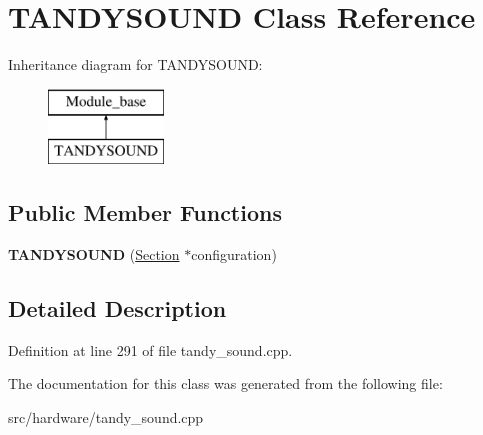 \hypertarget{classTANDYSOUND}{\section{T\-A\-N\-D\-Y\-S\-O\-U\-N\-D Class Reference}
\label{classTANDYSOUND}
}
Inheritance diagram for T\-A\-N\-D\-Y\-S\-O\-U\-N\-D\-:\begin{figure}[H]
\begin{center}
\leavevmode
\includegraphics[height=2.000000cm]{classTANDYSOUND}
\end{center}
\end{figure}
\subsection*{Public Member Functions}
\begin{DoxyCompactItemize}
\item 
\hypertarget{classTANDYSOUND_a3595cf4fd040eb563c9ffb1dc69944b8}{{\bfseries T\-A\-N\-D\-Y\-S\-O\-U\-N\-D} (\hyperlink{classSection}{Section} $\ast$configuration)}\label{classTANDYSOUND_a3595cf4fd040eb563c9ffb1dc69944b8}

\end{DoxyCompactItemize}


\subsection{Detailed Description}


Definition at line 291 of file tandy\-\_\-sound.\-cpp.



The documentation for this class was generated from the following file\-:\begin{DoxyCompactItemize}
\item 
src/hardware/tandy\-\_\-sound.\-cpp\end{DoxyCompactItemize}

